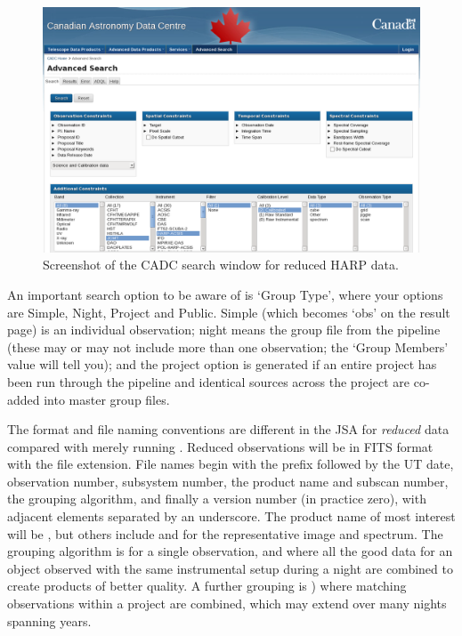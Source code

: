 \documentclass[11pt,oneside,chapters]{starlink}
\begin{document}
\begin{figure}[b!]
\begin{center}
\includegraphics[width=0.98\linewidth]{sc20_cadc}
\caption{\label{fig:cadc}
  Screenshot of the CADC search window for reduced HARP data.}
\end{center}
\end{figure}

An important search option to be aware of is `Group Type', where your
options are Simple, Night, Project and Public. Simple (which becomes
`obs' on the result page) is an individual observation; night means
the group file from the pipeline (these may or may not include more
than one observation; the `Group Members' value will tell you); and the
project option is generated if an entire project has been run through
the pipeline and identical sources across the project are co-added
into master group files.

The format and file naming conventions are different in the JSA for
\emph{reduced} data compared with merely running \ORACDR.  Reduced
observations will be in FITS format with the  file
extension.  File names begin with the  prefix followed by
the UT date, observation number, subsystem number, the product name
and subscan number, the grouping algorithm, and finally a version
number (in practice zero), with adjacent elements separated by an
underscore.  The product name of most interest will be ,
but others include  and  for the representative
image and spectrum.  The grouping algorithm is  for a single
observation, and  where all the good data for an object observed
with the same instrumental setup during a night are combined to create
products of better quality.  A further grouping is ) where
matching observations within a project are combined, which may extend
over many nights spanning years.
\end{document}
